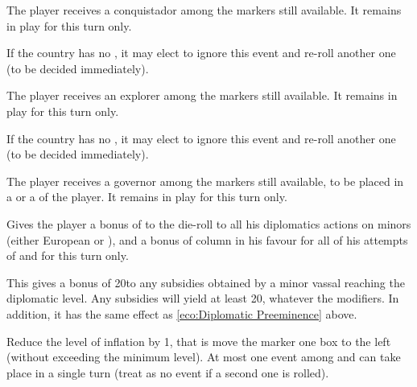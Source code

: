 The player receives a conquistador among the \anonyme \LeaderC markers still
available. It remains in play for this turn only.




If the country has no \anonyme\LeaderE, it may elect to ignore this event and
re-roll another one (to be decided immediately).

The player receives an explorer among the \anonyme \LeaderE markers still
available. It remains in play for this turn only.




If the country has no \anonyme\LeaderGov, it may elect to ignore this event
and re-roll another one (to be decided immediately).

The player receives a governor among the \anonyme \LeaderG markers still
available, to be placed in a \TP or a \COL of the player.  It remains in play
for this turn only.




Gives the player a bonus of  to the die-roll to all his diplomatics
actions on minors (either European or \ROTW), and a bonus of  column
in his favour for all of his attempts of \TP and \COLaction for this turn
only.




This gives a bonus of 20\ducats to any subsidies obtained by a minor vassal
reaching the \SUB diplomatic level. Any subsidies will yield at least
20\ducats, whatever the modifiers.  In addition, it has the same effect as
\ref{eco:Diplomatic Preeminence} above.




Reduce the level of inflation by 1, that is move the marker one box to the
left (without exceeding the minimum level). At most one event among
 and  can take place in a
single turn (treat as no event if a second one is rolled).




